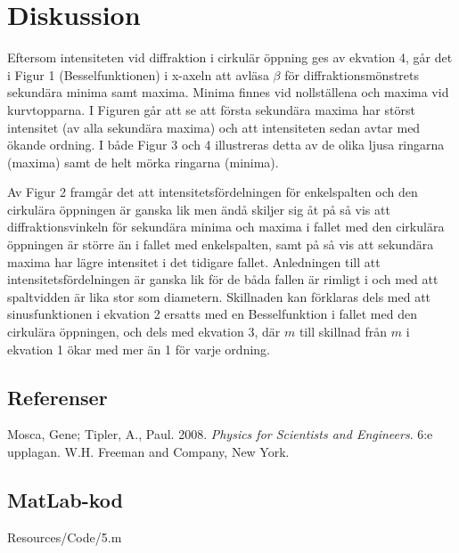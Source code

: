 \section{Diskussion}
Eftersom intensiteten vid diffraktion i cirkulär öppning ges av ekvation 4, går det i Figur 1 (Besselfunktionen) i x-axeln att avläsa $\beta$ för diffraktionsmönstrets sekundära minima samt maxima. Minima finnes vid nollställena och maxima vid kurvtopparna. I Figuren går att se att första sekundära maxima har störst intensitet (av alla sekundära maxima) och att intensiteten sedan avtar med ökande ordning. I både Figur 3 och 4 illustreras detta av de olika ljusa ringarna (maxima) samt de helt mörka ringarna (minima).

Av Figur 2 framgår det att intensitetsfördelningen för enkelspalten och den cirkulära öppningen är ganska lik men ändå skiljer sig åt på så vis att diffraktionsvinkeln för sekundära minima och maxima i fallet med den cirkulära öppningen är större än i fallet med enkelspalten, samt på så vis att sekundära maxima har lägre intensitet i det tidigare fallet. Anledningen till att intensitetsfördelningen är ganska lik för de båda fallen är rimligt i och med att spaltvidden är lika stor som diametern. Skillnaden kan förklaras dels med att sinusfunktionen i ekvation 2 ersatts med en Besselfunktion i fallet med den cirkulära öppningen, och dels med ekvation 3, där $m$ till skillnad från $m$ i ekvation 1 ökar med mer än 1 för varje ordning.

\subsection*{Referenser}
Mosca, Gene; Tipler, A., Paul. 2008. \textit{Physics for Scientists and Engineers}. 6:e upplagan. W.H. Freeman and Company, New York.

\np
\subsection*{MatLab-kod}
 {Resources/Code/5.m}































